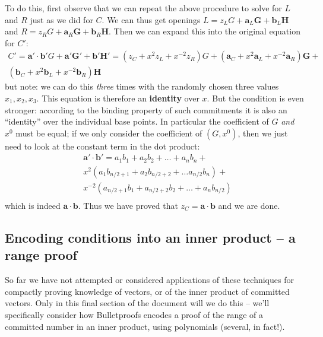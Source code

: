 \documentclass[10pt,a4paper]{article}
\begin{document}
To do this, first observe that we can repeat the above procedure to
solve for $L$ and $R$ just as we did for $C$. We can thus get openings $L = z_L G + \textbf{a}_L \textbf{G} + \textbf{b}_L \textbf{H}$ and $R = z_R G + \textbf{a}_R \textbf{G} + \textbf{b}_R \textbf{H}$. Then
we can expand this into the original equation for $C'$:
\begin{align*}
C' = \textbf{a}' \cdot \textbf{b}' G + \textbf{a}'\textbf{G}' + \textbf{b}'\textbf{H}' = (z_C + x^2z_L + x^{-2}z_R)G + (\textbf{a}_C + x^{2}\textbf{a}_L + x^{-2}\textbf{a}_R)\textbf{G} + \\
(\textbf{b}_C + x^2\textbf{b}_L + x^{-2}\textbf{b}_R)\textbf{H} 
\end{align*}
but note: we can do this \emph{three }times with the randomly chosen
three values $x_1, x_2, x_3$. This equation is therefore an \textbf{identity} over $x$.
But the condition is even stronger: according to the binding property of
such commitments it is also an ``identity'' over the individual base
points. In particular the coefficient of $G$ \emph{and} $x^0$ must be equal; if we
only consider the coefficient of $(G, x^0)$, then we just need to look at the
constant term in the dot product:
\begin{align*}
& \textbf{a}' \cdot \textbf{b}' = a_1b_1 + a_2b_2 + \ldots + a_n b_n + \\
&x^2(a_1b_{n/2+1} + a_2b_{n/2+2} + \ldots a_{n/2}b_{n} ) + \\
&x^{-2}(a_{n/2+1}b_1 + a_{n/2+2}b_2 + \ldots + a_nb_{n/2}) \\
\end{align*}
which is indeed $\mathbf{a}\cdot \mathbf{b}$. Thus we have proved that $z_C = \textbf{a} \cdot \textbf{b}$ and we are done.

\hypertarget{encoding-conditions-into-an-inner-product-a-range-proof}{%
\subsection[Encoding conditions into an inner product -- a range
proof]{\texorpdfstring{\protect\hypertarget{anchor-53}{}{}Encoding
conditions into an inner product -- a range
proof}{Encoding conditions into an inner product -- a range proof}}\label{encoding-conditions-into-an-inner-product-a-range-proof}}

So far we have not attempted or considered applications of these
techniques for compactly proving knowledge of vectors, or of the inner
product of committed vectors. Only in this final section of the document
will we do this -- we'll specifically consider how Bulletproofs encodes
a proof of the range of a committed number in an inner product, using
polynomials (several, in fact!).
\end{document}
